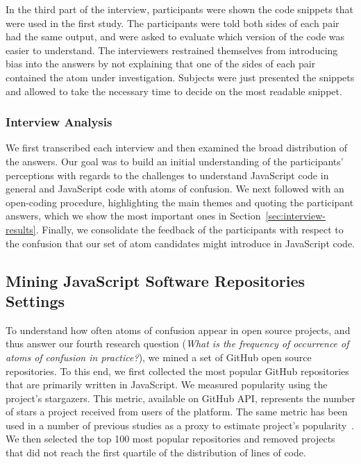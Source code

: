 In the third part of the interview, participants were shown the code snippets that were used in the first study. The participants were told both sides of each pair had the same output, and were asked to evaluate which version of the code was easier to understand. The interviewers restrained themselves from introducing bias into the answers by not explaining that one of the sides of each pair contained the atom under investigation. Subjects were just presented the snippets and allowed to take the necessary time to decide on the most readable snippet.

\subsubsection*{Interview Analysis}

We first transcribed each interview and then examined the broad distribution of the answers. Our goal was to build an initial understanding of the participants' perceptions with regards to the challenges to understand JavaScript code in general and JavaScript code with atoms of confusion. We next followed with an open-coding	procedure, highlighting	the main themes and quoting the participant answers, which we show the most important ones in
Section~\ref{sec:interview-results}. Finally, we consolidate the feedback of the participants with respect to the confusion that our set of atom candidates might introduce in JavaScript code.




\subsection{Mining JavaScript Software Repositories Settings}

To understand how often atoms of confusion appear in open source projects, and thus answer our fourth research question (\emph{What is the frequency of occurrence of atoms of confusion in practice?}), we mined a set of GitHub open source repositories. To this end, we first collected the most popular GitHub repositories that are primarily written in JavaScript. We measured popularity using the project's stargazers. This metric, available on  GitHub API, represents the number of stars a project received from users of the platform. The same metric has been used in a number of previous studies as a proxy to estimate project's popularity~\cite{gyimesi2019bugsjs,canedo:esem2020}. We then selected the top 100 most popular repositories and removed projects that did not reach the first quartile of the distribution of lines of code.

